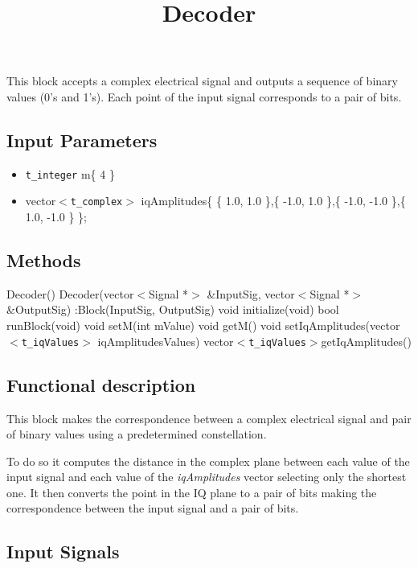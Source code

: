 \documentclass[a4paper]{article}
\title{Decoder}
\begin{document}
\maketitle

This block accepts a complex electrical signal and outputs a sequence of binary values (0's and 1's). Each point of the input signal corresponds to a pair of bits.

\subsection*{Input Parameters}

\begin{itemize}
	\item\texttt{t\_integer} m\{ 4 \}
	\item vector$<$\texttt{t\_complex}$>$ iqAmplitudes\{ \{ 1.0, 1.0 \},\{ -1.0, 1.0 \},\{ -1.0, -1.0 \},\{ 1.0, -1.0 \} \};
\end{itemize}

\subsection*{Methods}
 
Decoder() {}
\bigbreak
Decoder(vector$<$Signal *$>$ \&InputSig, vector$<$Signal *$>$ \&OutputSig) :Block(InputSig, OutputSig) {}
\bigbreak
void initialize(void)
\bigbreak
bool runBlock(void)
\bigbreak
void setM(int mValue)
\bigbreak
void getM()
\bigbreak
void setIqAmplitudes(vector$<$\texttt{t\_iqValues}$>$ iqAmplitudesValues)
\bigbreak
vector$<$\texttt{t\_iqValues}$>$getIqAmplitudes()

\subsection*{Functional description}

This block makes the correspondence between a complex electrical signal and pair of binary values using a predetermined constellation.

To do so it computes the distance in the complex plane between each value of the input signal and each value of the \textit{iqAmplitudes} vector selecting only the shortest one. It then converts the point in the IQ plane to a pair of bits making the correspondence between the input signal and a pair of bits.

\pagebreak

\subsection*{Input Signals}
\end{document}
